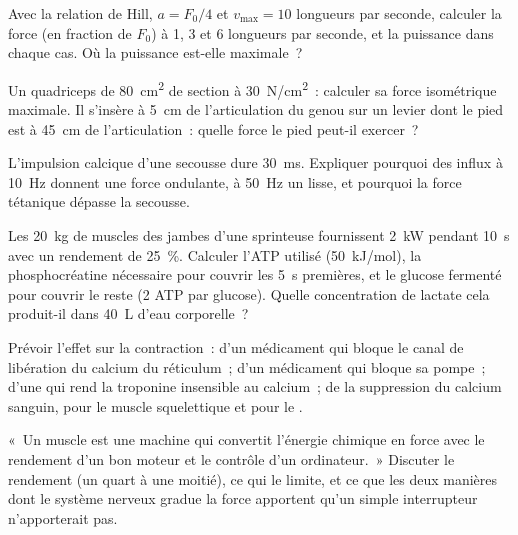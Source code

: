 \begin{exercise}[$\star\star$]\label{exo:b2:muscle-movement:7}
Avec la relation de Hill, $a = F_0/4$ et $v_{\max} = 10$ longueurs par
seconde, calculer la force (en fraction de $F_0$) à 1, 3 et 6
longueurs par seconde, et la puissance dans chaque cas. Où la puissance
est-elle maximale~?
\end{exercise}

\begin{exercise}[$\star\star$]\label{exo:b2:muscle-movement:8}
Un quadriceps de \qty{80}{cm^2} de section à \qty{30}{N/cm^2}~:
calculer sa force isométrique maximale. Il s'insère à \qty{5}{cm} de
l'articulation du genou sur un levier dont le pied est à \qty{45}{cm} de
l'articulation~: quelle force le pied peut-il exercer~?
\end{exercise}

\begin{exercise}[$\star\star$]\label{exo:b2:muscle-movement:9}
L'impulsion calcique d'une secousse dure \qty{30}{ms}. Expliquer pourquoi
des influx à \qty{10}{Hz} donnent une force ondulante, à \qty{50}{Hz} un
 lisse, et pourquoi la force tétanique dépasse la secousse.
\end{exercise}

\begin{exercise}[$\star\star\star$]\label{exo:b2:muscle-movement:10}
Les \qty{20}{kg} de muscles des jambes d'une sprinteuse fournissent
\qty{2}{kW} pendant \qty{10}{s} avec un rendement de \qty{25}{\%}.
Calculer l'ATP utilisé (\qty{50}{kJ/mol}), la phosphocréatine nécessaire
pour couvrir les \qty{5}{s} premières, et le glucose fermenté pour
couvrir le reste (2 ATP par glucose). Quelle concentration de lactate
cela produit-il dans \qty{40}{L} d'eau corporelle~?
\end{exercise}

\begin{exercise}[$\star\star\star$]\label{exo:b2:muscle-movement:11}
Prévoir l'effet sur la contraction~: d'un médicament qui bloque le canal
de libération du calcium du réticulum~; d'un médicament qui bloque sa
pompe~; d'une  qui rend la troponine insensible au calcium~; de
la suppression du calcium sanguin, pour le muscle squelettique et pour le
.
\end{exercise}

\begin{exercise}[$\star\star\star$]\label{exo:b2:muscle-movement:12}
«~Un muscle est une machine qui convertit l'énergie chimique en force
avec le rendement d'un bon moteur et le contrôle d'un ordinateur.~»
Discuter le rendement (un quart à une moitié), ce qui le limite, et ce
que les deux manières dont le système nerveux gradue la force apportent
qu'un simple interrupteur n'apporterait pas.
\end{exercise}

